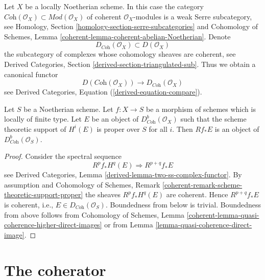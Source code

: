 \noindent
Let $X$ be a locally Noetherian scheme. In this case the category
$\textit{Coh}(\mathcal{O}_X) \subset \textit{Mod}(\mathcal{O}_X)$
of coherent $\mathcal{O}_X$-modules is a weak Serre subcategory, see
Homology, Section \ref{homology-section-serre-subcategories}
and
Cohomology of Schemes, Lemma \ref{coherent-lemma-coherent-abelian-Noetherian}.
Denote
$$
D_{\textit{Coh}}(\mathcal{O}_X) \subset D(\mathcal{O}_X)
$$
the subcategory of complexes whose cohomology sheaves are coherent, see
Derived Categories, Section \ref{derived-section-triangulated-sub}.
Thus we obtain a canonical functor
\begin{equation}
\label{equation-compare-coherent}
D(\textit{Coh}(\mathcal{O}_X))
\longrightarrow
D_{\textit{Coh}}(\mathcal{O}_X)
\end{equation}
see Derived Categories, Equation (\ref{derived-equation-compare}).

\begin{lemma}
\label{lemma-direct-image-coherent}
Let $S$ be a Noetherian scheme. Let $f : X \to S$ be a morphism of schemes
which is locally of finite type. Let $E$ be an object of
$D^b_{\textit{Coh}}(\mathcal{O}_X)$ such that the scheme theoretic support
of $H^i(E)$ is proper over $S$ for all $i$.
Then $Rf_*E$ is an object of $D^b_{\textit{Coh}}(\mathcal{O}_S)$.
\end{lemma}

\begin{proof}
Consider the spectral sequence
$$
R^pf_*H^q(E) \Rightarrow R^{p + q}f_*E
$$
see Derived Categories, Lemma \ref{derived-lemma-two-ss-complex-functor}.
By assumption and
Cohomology of Schemes, Remark
\ref{coherent-remark-scheme-theoretic-support-proper}
the sheaves $R^pf_*H^q(E)$ are coherent. Hence
$R^{p + q}f_*E$ is coherent, i.e., $E \in D_{\textit{Coh}}(\mathcal{O}_S)$.
Boundedness from below is trivial. Boundedness from above
follows from
Cohomology of Schemes, Lemma
\ref{coherent-lemma-quasi-coherence-higher-direct-images}
or from
Lemma \ref{lemma-quasi-coherence-direct-image}.
\end{proof}








\section{The coherator}
\label{section-coherator}

